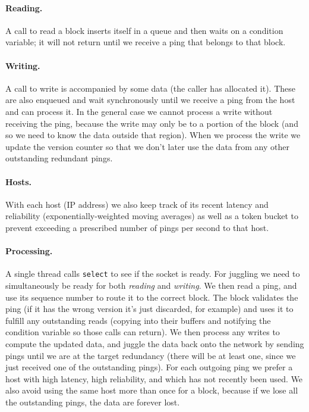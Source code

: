 \documentclass[twocolumn]{article}
\begin{document}
\paragraph{Reading.} A call to read a block inserts itself in a queue
and then waits on a condition variable; it will not return until we
receive a ping that belongs to that block.

\paragraph{Writing.} A call to write is accompanied by some data (the
caller has allocated it). These are also enqueued and wait
synchronously until we receive a ping from the host and can process
it. In the general case we cannot process a write without receiving
the ping, because the write may only be to a portion of the block (and
so we need to know the data outside that region). When we process the
write we update the version counter so that we don't later use the
data from any other outstanding redundant pings.

\paragraph{Hosts.} With each host (IP address) we also keep track of
its recent latency and reliability (exponentially-weighted moving
averages) as well as a token bucket to prevent exceeding a prescribed
number of pings per second to that host.

\paragraph{Processing.} A single thread calls {\tt select} to see
if the socket is ready. For juggling we need to simultaneously be
ready for both {\em reading} and {\em writing}. We then read a ping,
and use its sequence number to route it to the correct block. The
block validates the ping (if it has the wrong version it's just
discarded, for example) and uses it to fulfill any outstanding reads
(copying into their buffers and notifying the condition variable so
those calls can return). We then process any writes to compute the
updated data, and juggle the data back onto the network by sending
pings until we are at the target redundancy (there will be at least
one, since we just received one of the outstanding pings). For each
outgoing ping we prefer a host with high latency, high reliability,
and which has not recently been used. We also avoid using the same
host more than once for a block, because if we lose all the
outstanding pings, the data are forever lost.
\end{document}
